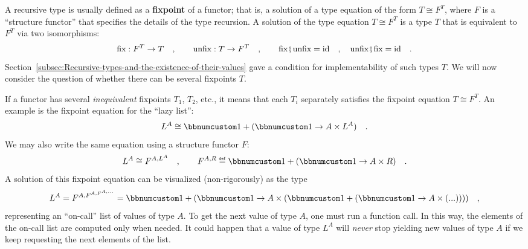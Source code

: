 A recursive type is usually defined as a \textbf{fixpoint} of
a functor; that is, a solution of a type equation
of the form $T\cong F^{T}$, where $F$ is a \textsf{``}structure functor\textsf{''}
that specifies the details of the type recursion. A solution of the
type equation $T\cong F^{T}$ is a type $T$ that is equivalent to
$F^{T}$ via two isomorphisms:
\[
\text{fix}:F^{T}\rightarrow T\quad,\quad\quad\text{unfix}:T\rightarrow F^{T}\quad,\quad\quad\text{fix}\bef\text{unfix}=\text{id}\quad,\quad\text{unfix}\bef\text{fix}=\text{id}\quad.
\]
Section~\ref{subsec:Recursive-types-and-the-existence-of-their-values}
gave a condition for implementability of such types $T$. We will
now consider the question of whether there can be several fixpoints
$T$.

If a functor has several \emph{inequivalent} fixpoints $T_{1}$, $T_{2}$,
etc., it means that each $T_{i}$ separately satisfies the fixpoint
equation $T\cong F^{T}$. An example is the fixpoint equation for
the \textsf{``}lazy list\textsf{''}:
\begin{equation}
L^{A}\cong\bbnum 1+(\bbnum 1\rightarrow A\times L^{A})\quad.\label{eq:fixpoint-type-equation-for-oncall-list}
\end{equation}
We may also write the same equation using a structure functor $F$:
\[
L^{A}\cong F^{A,L^{A}}\quad,\quad\quad F^{A,R}\triangleq\bbnum 1+(\bbnum 1\rightarrow A\times R)\quad.
\]
A solution of this fixpoint equation can be visualized (non-rigorously)
as the type
\[
L^{A}=F^{A,F^{A,F^{A,...}}}=\bbnum 1+(\bbnum 1\rightarrow A\times(\bbnum 1+(\bbnum 1\rightarrow A\times(...))))\quad,
\]
representing an \textsf{``}on-call\textsf{''} list of values of type $A$. To get
the next value of type $A$, one must run a function call. In this
way, the elements of the on-call list are computed only when needed.
It could happen that a value of type $L^{A}$ will \emph{never} stop
yielding new values of type $A$ if we keep requesting the next elements
of the list.

